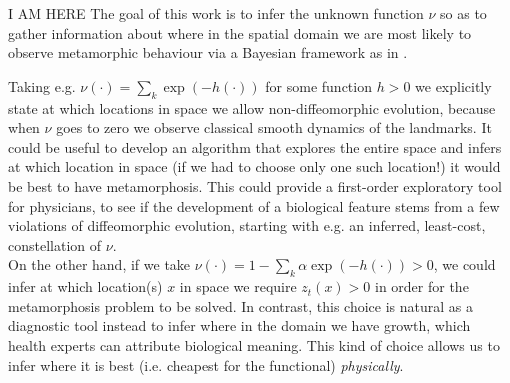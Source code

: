 \documentclass[runningheads]{llncs}
\begin{document}
{\color{red} I AM HERE}
The goal of this work is to infer the unknown function $\nu$ so as to gather
information about where in the spatial domain we are most likely to observe
metamorphic behaviour via a Bayesian framework as in \cite{dashti2017bayesian}.

\begin{remark}\label{remark:nu}
Taking e.g. $\nu(\cdot) = \sum_k \exp(-h(\cdot))$ for some function $h>0$ we
explicitly state at which locations in space we allow non-diffeomorphic
evolution, because when $\nu$ goes to zero we observe classical smooth dynamics
of the landmarks.  It could be useful to develop an algorithm that explores the
entire space and infers at which location in space (if we had to choose only one
such location!) it would be best to have metamorphosis. This could provide a
first-order exploratory tool for physicians, to see if the development of a
biological feature stems from a few violations of diffeomorphic evolution,
starting with e.g. an inferred, least-cost, constellation of $\nu$.\\

On the other hand, if we take $\nu(\cdot) = 1 - \sum_k \alpha
\exp(-h(\cdot))>0$, we could infer at which location(s) $x$ in space we require
$z_t(x)>0$ in order for the metamorphosis problem to be solved. In contrast,
this choice is natural as a diagnostic tool instead to infer where in the domain
we have growth, which health experts can attribute biological meaning. This kind
of choice allows us to infer where it is best (i.e. cheapest for the functional)
\emph{physically}.
\end{remark}
\end{document}

